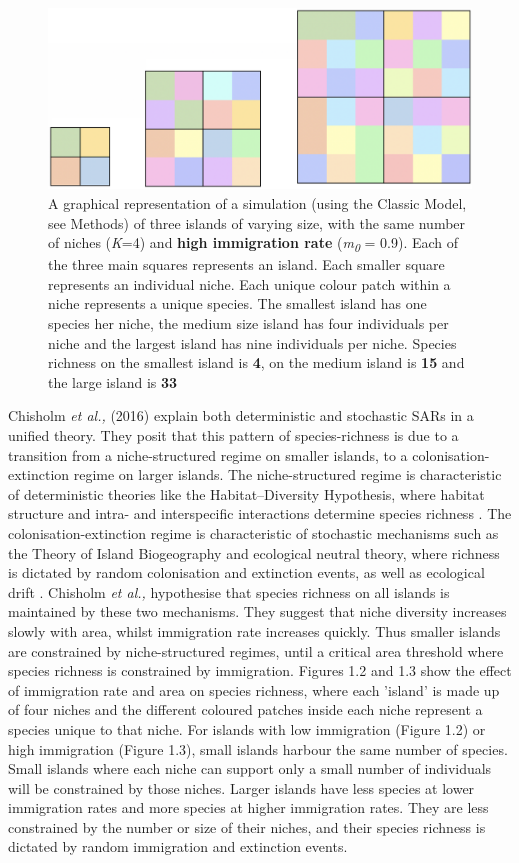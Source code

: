 \begin{figure}[htp]

\centering
\includegraphics[width=.5\textwidth]{HighImIslands.png}\hfill


\caption{A graphical representation of a simulation (using the Classic Model, see Methods) of three islands of varying size, with the same number of niches (\textit{K}=4) and \textbf{high immigration rate} (\textit{m\textsubscript{0}} = 0.9). Each of the three main squares represents an island. Each smaller square represents an individual niche. Each unique colour patch within a niche represents a unique species. The smallest island has one species her niche, the medium size island has four individuals per niche and the largest island has nine individuals per niche. Species richness on the smallest island is \textbf{4}, on the medium island is \textbf{15} and the large island is \textbf{33}}
\label{fig:figure3}

\end{figure}

\noindent Chisholm \textit{et al.,} (2016) explain both deterministic and stochastic SARs in a unified theory. They posit that this pattern of species-richness is due to a transition from a niche-structured regime on smaller islands, to a colonisation-extinction regime on larger islands. The niche-structured regime is characteristic of deterministic theories like the Habitat--Diversity Hypothesis, where habitat structure and intra- and interspecific interactions determine species richness \cite{chase2011disentangling}. The colonisation-extinction regime is characteristic of stochastic mechanisms such as the Theory of Island Biogeography and ecological neutral theory, where richness is dictated by random colonisation and extinction events, as well as ecological drift \cite{hubbell2001unified}. Chisholm \textit{et al.,} hypothesise that species richness on all islands is maintained by these two mechanisms. They suggest that niche diversity increases slowly with area, whilst immigration rate increases quickly. Thus smaller islands are constrained by niche-structured regimes, until a critical area threshold where species richness is constrained by immigration. Figures 1.2 and 1.3 show the effect of immigration rate and area on species richness, where each 'island' is made up of four niches and the different coloured patches inside each niche represent a species unique to that niche. For islands with low immigration (Figure 1.2) or high immigration (Figure 1.3), small islands harbour the same number of species. Small islands where each niche can support only a small number of individuals will be constrained by those niches. Larger islands have less species at lower immigration rates and more species at higher immigration rates. They are less constrained by the number or size of their niches, and their species richness is dictated by random immigration and extinction events. \\

